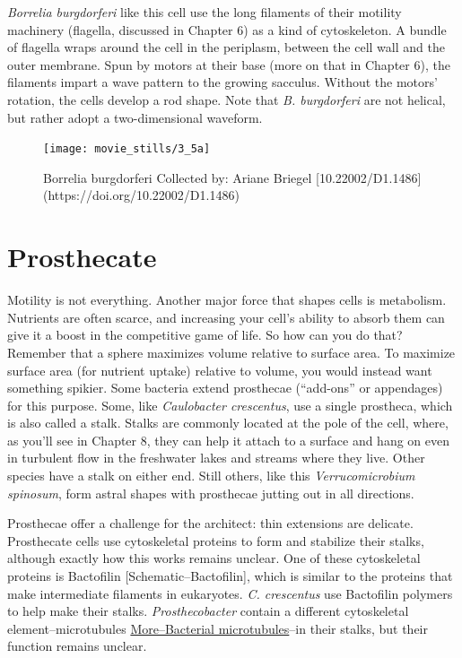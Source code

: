 \documentclass[]{tufte-book}
\begin{document}
\emph{Borrelia burgdorferi} like this cell use the long filaments of
their motility machinery (flagella, discussed in Chapter 6) as a kind of
cytoskeleton. A bundle of flagella wraps around the cell in the
periplasm, between the cell wall and the outer membrane. Spun by motors
at their base (more on that in Chapter 6), the filaments impart a wave
pattern to the growing sacculus. Without the motors' rotation, the cells
develop a rod shape. Note that \emph{B. burgdorferi} are not helical,
but rather adopt a two-dimensional waveform.

\begin{figure}
\texttt{[image: movie\_stills/3\_5a]} \caption[Borrelia burgdorferi Collected by]{Borrelia burgdorferi Collected by: Ariane Briegel [10.22002/D1.1486](https://doi.org/10.22002/D1.1486)}\label{fig:unnamed-chunk-53}
\end{figure}

\section{Prosthecate}\label{prosthecate}

Motility is not everything. Another major force that shapes cells is
metabolism. Nutrients are often scarce, and increasing your cell's
ability to absorb them can give it a boost in the competitive game of
life. So how can you do that? Remember that a sphere maximizes volume
relative to surface area. To maximize surface area (for nutrient uptake)
relative to volume, you would instead want something spikier. Some
bacteria extend prosthecae (``add-ons'' or appendages) for this purpose.
Some, like \emph{Caulobacter crescentus}, use a single prostheca, which
is also called a stalk. Stalks are commonly located at the pole of the
cell, where, as you'll see in Chapter 8, they can help it attach to a
surface and hang on even in turbulent flow in the freshwater lakes and
streams where they live. Other species have a stalk on either end. Still
others, like this \emph{Verrucomicrobium spinosum}, form astral shapes
with prosthecae jutting out in all directions.

Prosthecae offer a challenge for the architect: thin extensions are
delicate. Prosthecate cells use cytoskeletal proteins to form and
stabilize their stalks, although exactly how this works remains unclear.
One of these cytoskeletal proteins is Bactofilin
{[}Schematic--Bactofilin{]}, which is similar to the proteins that make
intermediate filaments in eukaryotes. \emph{C. crescentus} use
Bactofilin polymers to help make their stalks. \emph{Prosthecobacter}
contain a different cytoskeletal element--microtubules
\protect\hyperlink{morebacterial-microtubules}{More--Bacterial
microtubules}--in their stalks, but their function remains unclear.
\end{document}
